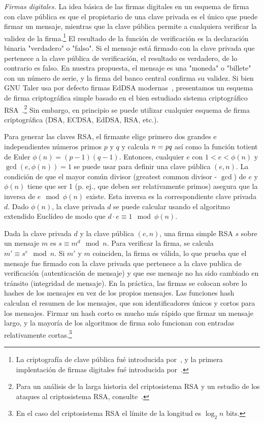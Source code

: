 \documentclass[10pt,spanish]{article}
\begin{document}
\emph{Firmas digitales.} La idea básica de las firmas digitales en un esquema
de firma con clave pública es que el propietario de una clave privada es el
único que puede firmar un mensaje, mientras que la clave pública permite a
cualquiera verificar la validez de la firma.\footnote{La criptografía de clave
pública fué introducida por~\citet{Diffie}, y la primera implentación de
firmas digitales fué introducida por~\citet{Rivest}.} El resultado de la
función de verificación es la declaración binaria "verdadero" o "falso". Si el
mensaje está firmado con la clave privada que pertenece a la clave pública de
verificación, el resultado es verdadero, de lo contrario es falso. En nuestra
propuesta, el mensaje es una "moneda" o "billete" con un número de serie, y la
firma del banco central confirma su validez. Si bien GNU Taler usa por defecto
firmas EdDSA modernas~\cite[véase][]{Bernstein2012}, presentamos un esquema de
firma criptográfica simple basado en el bien estudiado sistema criptográfico
RSA~\cite{Rivest}.\footnote{Para un análisis de la larga historia del
criptosistema RSA y un estudio de los ataques al criptosistema RSA,
consulte~\citet{Boneh}.} Sin embargo, en principio se puede utilizar cualquier
esquema de firma criptográfica (DSA, ECDSA, EdDSA, RSA, etc.).

Para generar las claves RSA, el firmante elige primero dos grandes e
independientes números primos $p$ y $q$ y calcula $n = \emph{pq}$
así como la función totient de Euler
$\phi(n) = (p - 1)(q - 1)$.
Entonces, cualquier $e$ con $1 < e < \phi(n)$ y
$\gcd(e, \phi(n)) = 1$ se puede usar para
definir una clave pública $(e,n)$. La condición de que el
mayor común divisor (greatest common divisor - $\gcd$) de $e$ y
$\phi(n)$ tiene que ser 1 (p. ej., que deben ser
relativamente primos) asegura que la inversa de
$e \mod \phi(n)$ existe.
Esta inversa es la
correspondiente clave privada $d$. Dado $\phi(n)$, la clave
privada $d$ se puede calcular usando el algoritmo extendido
Euclídeo de modo que
$d \cdot e \equiv 1 \mod \phi(n)$.

Dada la clave privada $d$ y la clave pública $(e, n)$, una firma simple RSA
$s$ sobre un mensaje $m$ es
$s \equiv m^{d} \mod n$.
Para verificar la firma, se calcula
$m' \equiv s^{e} \mod n$.
Si $m'$ y $m$ coinciden, la firma es válida, lo que prueba que el
mensaje fue firmado con la clave privada que pertenece a la clave
publica de verificación (autenticación de mensaje) y que ese mensaje no
ha sido cambiado en tránsito (integridad de mensaje). En la práctica,
las firmas se colocan sobre lo hashes de los mensajes en vez de los
propios mensajes. Las funciones hash calculan el resumen de los
mensajes, que son identificadores únicos y cortos para los mensajes.
Firmar un hash corto es mucho más rápido que firmar un mensaje largo, y
la mayoría de los algoritmos de firma solo funcionan con entradas
relativamente cortas.\footnote{En el caso del criptosistema RSA el
límite de la longitud es $\log_{2}n$ bits.}
\end{document}
